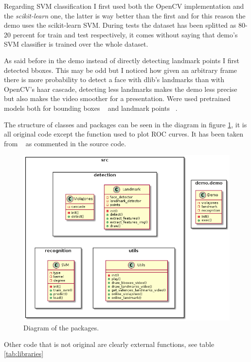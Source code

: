Regarding SVM classification I first used both the OpenCV implementation and the \textit{scikit-learn} one, the latter is way better than the first and for this reason the demo uses the scikit-learn SVM.
During tests the dataset has been splitted as 80-20 percent for train and test respectively, it comes without saying that demo's SVM classifier is trained over the whole dataset.  

As said before in the demo instead of directly detecting landmark points I first detected bboxes. 
This may be odd but I noticed how given an arbitrary frame there is more probability to detect a face with dlib's landmarks than with OpenCV's haar cascade, detecting less landmarks makes the demo less precise but also makes the video smoother for a presentation.
Were used pretrained models both for bounding boxes ~\cite{dataset:haar} and landmark points ~\cite{dataset:landmark}.

The structure of classes and packages can be seen in the diagram in figure \ref{fig:packages_diagram}, it is all original code except the function  used to plot ROC curves. It has been taken from ~\cite{roc} as commented in the source code.

\begin{figure}[h!t]
    \centering
    \includegraphics[scale=0.49]{../diagrams/out/classes/classes.png}
    \caption{Diagram of the packages.}
    \label{fig:packages_diagram}
\end{figure}

Other code that is not original are clearly external functions, see table \ref{tab:libraries}

